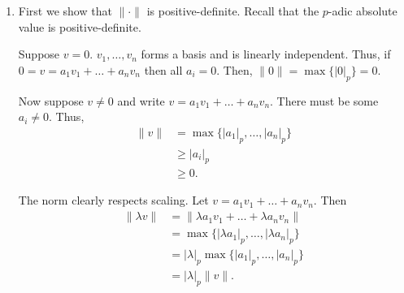 \documentclass[12 pt, letterpaper]{hmcpset}
\begin{document}
\begin{solution}
	\begin{enumerate}
		\item First we show that $\lVert \cdot \rVert$ is positive-definite.
			Recall that the $p$-adic absolute value is positive-definite.

			Suppose $v = 0$. $v_{1}, \dots, v_{n}$ forms a basis and is linearly independent.
			Thus, if $0 = v = a_{1} v_{1} + \dots + a_{n} v_{n}$ then all $a_{i} = 0$.
			Then, $\lVert 0 \rVert = \max \{ \lvert 0 \rvert_{p} \} = 0$.

			Now suppose $v \neq 0$ and write $v = a_{1} v_{1} + \dots + a_{n} v_{n}$.
			There must be some $a_{i} \neq 0$.
			Thus,
			\begin{align*}
				\lVert v \rVert
				& = \max \{ \lvert a_{1} \rvert_{p}, \dots, \lvert a_{n} \rvert_{p} \} \\
				& \ge \lvert a_{i} \rvert_{p} \\
				& \ge 0.
			\end{align*}

			The norm clearly respects scaling. Let $v = a_{1} v_{1} + \dots + a_{n} v_{n}$.
			Then 
			\begin{align*}
				\lVert \lambda v \rVert & = \lVert \lambda a_{1} v_{1} + \dots + \lambda a_{n} v_{n} \rVert \\
							& = \max \{ \lvert \lambda a_{1} \rvert_{p}, \dots, \lvert \lambda a_{n} \rvert_{p} \} \\
							& = \lvert \lambda \rvert_{p} \max \{ \lvert a_{1} \rvert_{p}, \dots, \lvert a_{n} \rvert_{p} \} \\
							& = \lvert \lambda \rvert_{p} \lVert v \rVert.
			\end{align*}


\end{enumerate}
\end{solution}
\end{document}
